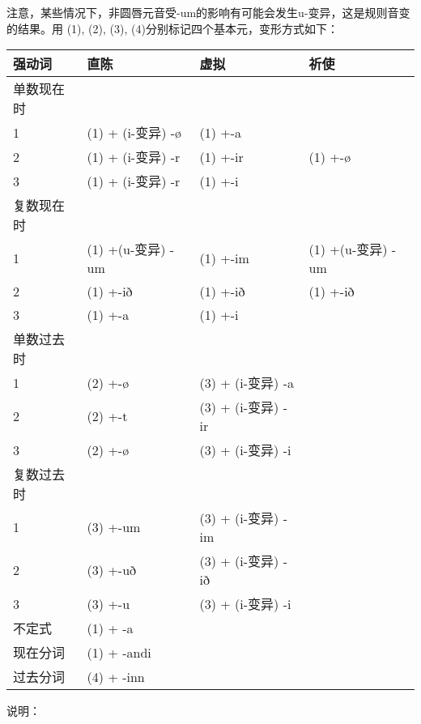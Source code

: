 注意，某些情况下，非圆唇元音受-um的影响有可能会发生u-变异，这是规则音变的结果。用
(1), (2), (3), (4)分别标记四个基本元，变形方式如下：

\begin{longtable}{llll}
\toprule
强动词 & 直陈 & 虚拟 & 祈使 \\
\midrule
\endhead
\bottomrule
\endfoot
单数现在时 & & & \\
1 & (1) + (i-变异) -ø & (1) +-a & \\
2 & (1) + (i-变异) -r & (1) +-ir & (1) +-ø \\
3 & (1) + (i-变异) -r & (1) +-i & \\
复数现在时 & & & \\
1 & (1) +(u-变异) -um & (1) +-im & (1) +(u-变异) -um \\
2 & (1) +-ið & (1) +-ið & (1) +-ið \\
3 & (1) +-a & (1) +-i & \\
单数过去时 & & & \\
1 & (2) +-ø & (3) + (i-变异) -a & \\
2 & (2) +-t & (3) + (i-变异) -ir & \\
3 & (2) +-ø & (3) + (i-变异) -i & \\
复数过去时 & & & \\
1 & (3) +-um & (3) + (i-变异) -im & \\
2 & (3) +-uð & (3) + (i-变异) -ið & \\
3 & (3) +-u & (3) + (i-变异) -i & \\
不定式 & (1) + -a & & \\
现在分词 & (1) + -andi & & \\
过去分词 & (4) + -inn & & \\
\end{longtable}

说明：

